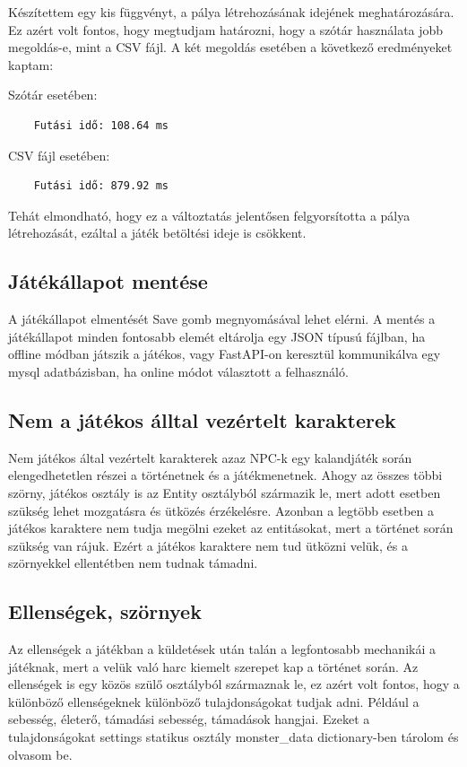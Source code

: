 Készítettem egy kis függvényt, a pálya létrehozásának idejének meghatározására. Ez azért volt fontos, hogy megtudjam határozni, hogy a szótár használata jobb megoldás-e, mint a CSV fájl. A két megoldás esetében a következő eredményeket kaptam:

Szótár esetében:
\begin{verbatim}
    Futási idő: 108.64 ms
\end{verbatim}
CSV fájl esetében:
\begin{verbatim}
    Futási idő: 879.92 ms
\end{verbatim}

\indent \indent Tehát elmondható, hogy ez a változtatás jelentősen felgyorsította a pálya létrehozását, ezáltal a játék betöltési ideje is csökkent.


\subsection{Játékállapot mentése}
\indent \indent A játékállapot elmentését Save gomb megnyomásával lehet elérni. A mentés a játékállapot minden fontosabb elemét eltárolja egy JSON típusú fájlban, ha offline módban játszik a játékos, vagy FastAPI-on keresztül kommunikálva egy mysql adatbázisban, ha online módot választott a felhasználó.


\subsection{Nem a játékos álltal vezértelt karakterek}
\indent \indent Nem játékos által vezértelt karakterek azaz NPC-k egy kalandjáték során elengedhetetlen részei a történetnek és a játékmenetnek. Ahogy az összes többi szörny, játékos osztály is az Entity osztályból származik le, mert adott esetben szükség lehet mozgatásra és ütközés érzékelésre. Azonban a legtöbb esetben a játékos karaktere nem tudja megölni ezeket az entitásokat, mert a történet során szükség van rájuk. Ezért a játékos karaktere nem tud ütközni velük, és a szörnyekkel ellentétben nem tudnak támadni.

\subsection{Ellenségek, szörnyek}

\indent \indent Az ellenségek a játékban a küldetések után talán a legfontosabb mechanikái a játéknak, mert a velük való harc kiemelt szerepet kap a történet során.
Az ellenségek is egy közös szülő osztályból származnak le, ez azért volt fontos, hogy a különböző ellenségeknek különböző tulajdonságokat tudjak adni. Például a sebesség, életerő, támadási sebesség, támadások hangjai. Ezeket a tulajdonságokat settings statikus osztály monster\_data dictionary-ben tárolom és olvasom be.

